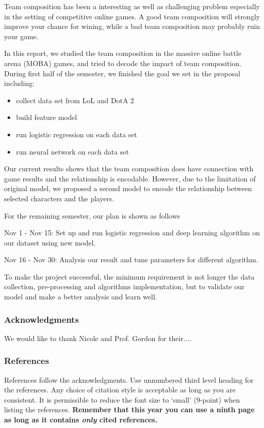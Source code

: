 \documentclass{article} %
\begin{document}
Team composition has been a interesting as well as challenging problem especially in the setting of competitive online games. A good team composition will strongly improve your chance for wining, while a bad team composition may probably ruin your game.

In this report, we studied the team composition in the massive online battle arena (MOBA) games, and tried to decode the impact of team composition.
During first half of the semester, we finished the goal we set in the proposal including:
\begin{itemize}
\item collect data set from LoL and DotA 2
\item build feature model
\item run logistic regression on each data set
\item run neural network on each data set
\end{itemize}


Our current results shows that the team composition does have connection with game results and the relationship is encodable. However, due to the limitation of original model, we proposed a second model to encode the relationship between selected characters and the players.

For the remaining semester, our plan is shown as follows

Nov 1 - Nov 15: Set up and run logistic regression and deep learning algorithm on our dataset using new model.

Nov 16 - Nov 30: Analysis our result and tune parameters for different algorithm.

To make the project successful, the minimum requirement is not longer the data collection, pre-processing and algorithms implementation, but to validate our model and make a better analysis and learn well.





\subsubsection*{Acknowledgments}

We would like to thank Nicole and Prof. Gordon for their....

\subsubsection*{References}


References follow the acknowledgments. Use unnumbered third level heading for
the references. Any choice of citation style is acceptable as long as you are
consistent. It is permissible to reduce the font size to `small' (9-point)
when listing the references. {\bf Remember that this year you can use
a ninth page as long as it contains \emph{only} cited references.}
\end{document}
